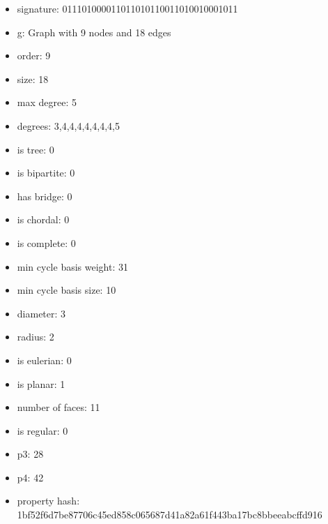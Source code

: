 \newpage
\begin{figure}
\end{figure}
\begin{itemize}
\item signature: 011101000011011010110011010010001011
\item g: Graph with 9 nodes and 18 edges
\item order: 9
\item size: 18
\item max degree: 5
\item degrees: 3,4,4,4,4,4,4,4,5
\item is tree: 0
\item is bipartite: 0
\item has bridge: 0
\item is chordal: 0
\item is complete: 0
\item min cycle basis weight: 31
\item min cycle basis size: 10
\item diameter: 3
\item radius: 2
\item is eulerian: 0
\item is planar: 1
\item number of faces: 11
\item is regular: 0
\item p3: 28
\item p4: 42
\item property hash: 1bf52f6d7be87706c45ed858c065687d41a82a61f443ba17bc8bbeeabcffd916
\end{itemize}
